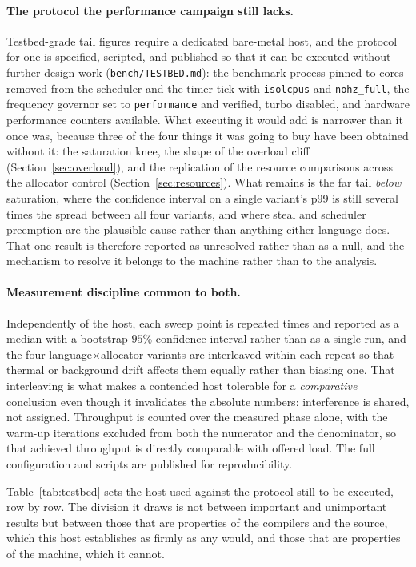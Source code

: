 \documentclass[english,twoside,openright,a4paper,censored,csm,software-track-2020]{HYthesisML}
\begin{document}
\paragraph{The protocol the performance campaign still lacks.}
Testbed-grade tail figures require a dedicated bare-metal host, and the protocol for one is
specified, scripted, and published so that it can be executed without further design work
(\texttt{bench/TESTBED.md}): the benchmark process pinned to cores removed from the scheduler and
the timer tick with \texttt{isolcpus} and \texttt{nohz\_full}, the frequency governor set to
\texttt{performance} and verified, turbo disabled, and hardware performance counters available.
What executing it would add is narrower than it once was, because three of the four things it was
going to buy have been obtained without it: the saturation knee, the shape of the overload cliff
(Section~\ref{sec:overload}), and the replication of the resource comparisons across the allocator
control (Section~\ref{sec:resources}). What remains is the far tail \emph{below} saturation,
where the confidence interval on a single variant's p99 is still several times the spread between
all four variants, and where steal and scheduler preemption are the plausible cause rather than
anything either language does. That one result is therefore reported as unresolved rather than as
a null, and the mechanism to resolve it belongs to the machine rather than to the analysis.

\paragraph{Measurement discipline common to both.}
Independently of the host, each sweep point is repeated \NRepeats{} times and reported as a
median with a bootstrap $95\%$ confidence interval rather than as a single run, and the four
language$\times$allocator variants are interleaved within each repeat so that thermal or
background drift affects them equally rather than biasing one. That interleaving is what makes
a contended host tolerable for a \emph{comparative} conclusion even though it invalidates the
absolute numbers: interference is shared, not assigned. Throughput is counted over the measured
phase alone, with the warm-up iterations excluded from both the numerator and the denominator,
so that achieved throughput is directly comparable with offered load. The full configuration
and scripts are published for reproducibility.

Table~\ref{tab:testbed} sets the host used against the protocol still to be executed, row by row.
The division it draws is not between important and unimportant results but between those that are
properties of the compilers and the source, which this host establishes as firmly as any would,
and those that are properties of the machine, which it cannot.
\end{document}
